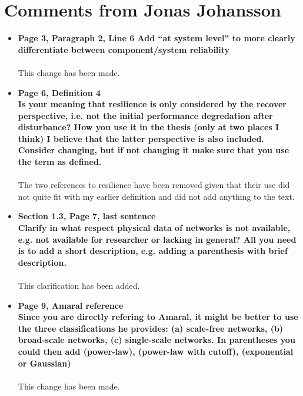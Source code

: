 \documentclass[a4paper,10pt]{article}
\begin{document}

\section{Comments from Jonas Johansson}

\begin{itemize}

 \item \textbf{Page 3, Paragraph 2, Line 6 Add ``at system level'' to more clearly differentiate between component/system reliability}\\
 \\
 This change has been made.
 
 \item \textbf{Page 6, Definition 4 \\
 Is your meaning that resilience is only considered by the recover perspective, i.e. not the initial performance degredation after disturbance? How you use it in the thesis (only at two places I think) I believe that the latter perspective is also included. Consider changing, but if not changing it make sure that you use the term as defined.}\\
 \\
 The two references to resilience have been removed given that their use did not quite fit with my earlier definition and did not add anything to the text.
 
 \item \textbf{Section 1.3, Page 7, last sentence \\
 Clarify in what respect physical data of networks is not available, e.g. not available for researcher or lacking in general? All you need is to add a short description, e.g. adding a parenthesis with brief description.}\\
 \\
 This clarification has been added.
 
 \item \textbf{Page 9, Amaral reference \\
 Since you are directly refering to Amaral, it might be better to use the three classifications he provides: (a) scale-free networks, (b) broad-scale networks, (c) single-scale networks. In parentheses you could then add (power-law), (power-law with cutoff), (exponential or Gaussian)}\\
 \\
 This change has been made.
 

\end{itemize}
\end{document}
